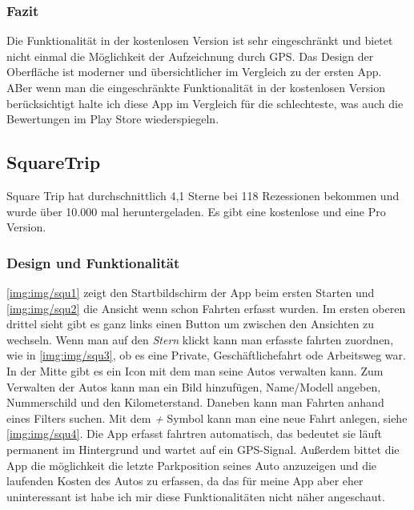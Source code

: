 \subsubsection{Fazit}
Die Funktionalität in der kostenlosen Version ist sehr eingeschränkt und bietet nicht einmal die
Möglichkeit der Aufzeichnung durch GPS. Das Design der Oberfläche ist moderner und übersichtlicher
im Vergleich zu der ersten App. ABer wenn man die eingeschränkte Funktionalität in der kostenlosen
Version berücksichtigt halte ich diese App im Vergleich für die schlechteste, was auch die Bewertungen
im Play Store wiederspiegeln.

\subsection{SquareTrip}
Square Trip hat durchschnittlich 4,1 Sterne bei 118 Rezessionen bekommen und wurde über 10.000
mal heruntergeladen. Es gibt eine kostenlose und eine Pro Version.


\subsubsection{Design und Funktionalität}
\ref{img:img/squ1} zeigt den Startbildschirm der App beim ersten Starten und \ref{img:img/squ2} die Ansicht wenn 
schon Fahrten erfasst wurden. Im ersten oberen drittel sieht gibt es ganz links einen Button um zwischen den Ansichten zu wechseln.
Wenn man auf den \textit{Stern} klickt kann man erfasste fahrten zuordnen, wie in \ref{img:img/squ3}, ob es eine Private, 
Geschäftlichefahrt ode Arbeitsweg war.
In der Mitte gibt es ein Icon mit dem man seine Autos verwalten kann. Zum Verwalten der Autos kann man ein Bild hinzufügen, 
Name/Modell angeben, Nummerschild und den Kilometerstand. Daneben kann man Fahrten anhand eines Filters suchen. Mit dem 
\textit{+} Symbol kann man eine neue Fahrt anlegen, siehe \ref{img:img/squ4}.
Die App erfasst fahrtren automatisch, das bedeutet sie läuft permanent im Hintergrund und wartet auf ein GPS-Signal.
Außerdem bittet die App die möglichkeit die letzte Parkposition seines Auto anzuzeigen und die
laufenden Kosten des Autos zu erfassen, da das für meine App aber eher uninteressant ist habe ich mir diese 
Funktionalitäten nicht näher angeschaut.  


